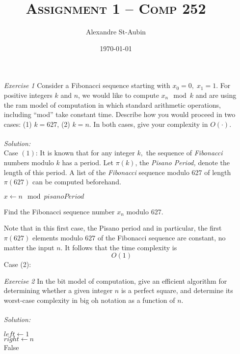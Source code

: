 \documentclass[12pt]{article}
\title{\textsc{Assignment 1 -- Comp 252}}
\author{Alexandre St-Aubin}
\date{\today}
\theoremstyle{definition}
\theoremstyle{remark}
\newcommand\sol{%
  \\ 
  \\
  \textit{Solution:}\\%
}
\begin{document}
\maketitle 
\begin{enumerate}
  \item[\it Exercise 1] Consider a Fibonacci sequence starting with $x_0 = 0,\; x_1 = 1$. For positive integers $k$ and $n$, we would like to compute $x_n \mod k$ and are using the ram model of computation in which standard arithmetic operations, including “mod” take constant time. Describe how you would proceed in two cases: (1) $k = 627$, (2) $k = n$. In both cases, give your complexity in $O(\cdot)$.
  \sol  
  Case $(1)$: It is known that for any integer $k,$ the sequence of \textit{Fibonacci} numbers modulo $k$ has a period. Let $\pi (k)$, the \textit{Pisano Period, }denote the length of this period. A list of the \textit{Fibonacci} sequence modulo 627 of length $\pi (627)$ can be computed beforehand. 

\IncMargin{1em}
\begin{algorithm}
\BlankLine
  {$x \leftarrow n \mod pisanoPeriod$}
\caption{Find the Fibonacci sequence number $x_n$ modulo 627. }\label{algo_disjdecomp}
\end{algorithm}\DecMargin{1em}
  Note that in this first case, the Pisano period and in particular, the first $\pi (627)$ elements modulo $627$ of the Fibonacci sequence are constant, no matter the input $n$. It follows that the time complexity is 
  $$O(1) $$
  Case (2): 

\newpage
\item[\it Exercise 2] In the bit model of computation, give an efficient algorithm for determining whether a given integer $n$ is a perfect square, and determine its worst-case complexity in big oh notation as a function of $n$.
\sol  
\IncMargin{1em}
\begin{algorithm}

\BlankLine
$left \leftarrow 1$ \\ 
$right \leftarrow n$ \\ 
  \Return False


\end{algorithm}
\end{enumerate}
\end{document}
